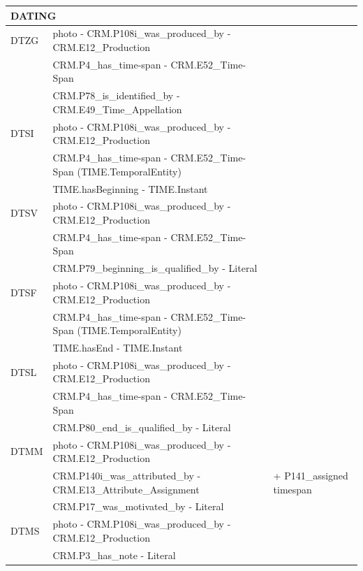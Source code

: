 \begin{center}
\begin{longtable}{ | p{1cm} | p{8cm} | p{3cm} | }
  \multicolumn{3}{|l|}{\cellcolor{lightcyan}DATING}\\ \hline
  DTZG &  photo - CRM.P108i\_was\_produced\_by - CRM.E12\_Production & \\
   & CRM.P4\_has\_time-span - CRM.E52\_Time-Span & \\
   & CRM.P78\_is\_identified\_by - CRM.E49\_Time\_Appellation & \\ \hline
  DTSI &  photo - CRM.P108i\_was\_produced\_by - CRM.E12\_Production & \\
   & CRM.P4\_has\_time-span - CRM.E52\_Time-Span (TIME.TemporalEntity) & \\
   & TIME.hasBeginning - TIME.Instant & \\ \hline
  DTSV &  photo - CRM.P108i\_was\_produced\_by - CRM.E12\_Production & \\
   & CRM.P4\_has\_time-span - CRM.E52\_Time-Span & \\
   & CRM.P79\_beginning\_is\_qualified\_by - Literal & \\ \hline
  DTSF &  photo - CRM.P108i\_was\_produced\_by - CRM.E12\_Production & \\
   & CRM.P4\_has\_time-span - CRM.E52\_Time-Span (TIME.TemporalEntity) & \\
   & TIME.hasEnd - TIME.Instant & \\ \hline
  DTSL &  photo - CRM.P108i\_was\_produced\_by - CRM.E12\_Production & \\
   & CRM.P4\_has\_time-span - CRM.E52\_Time-Span & \\
   & CRM.P80\_end\_is\_qualified\_by - Literal & \\ \hline
  DTMM &  photo - CRM.P108i\_was\_produced\_by - CRM.E12\_Production & \\
   & CRM.P140i\_was\_attributed\_by - CRM.E13\_Attribute\_Assignment & + P141\_assigned timespan\\
   & CRM.P17\_was\_motivated\_by - Literal & \\ \hline
  DTMS &  photo - CRM.P108i\_was\_produced\_by - CRM.E12\_Production & \\
   & CRM.P3\_has\_note - Literal & \\ \hline
  

\end{longtable}
\end{center}
